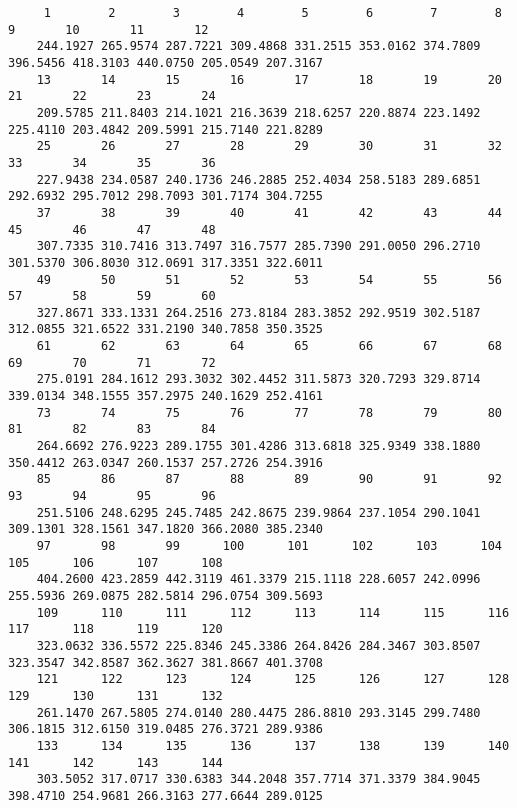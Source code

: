 \documentclass[12pt,letterpaper]{article}
\begin{document}
\begin{enumerate}
	\begin{verbatim}
	 1        2        3        4        5        6        7        8        9       10       11       12 
	244.1927 265.9574 287.7221 309.4868 331.2515 353.0162 374.7809 396.5456 418.3103 440.0750 205.0549 207.3167 
	13       14       15       16       17       18       19       20       21       22       23       24 
	209.5785 211.8403 214.1021 216.3639 218.6257 220.8874 223.1492 225.4110 203.4842 209.5991 215.7140 221.8289 
	25       26       27       28       29       30       31       32       33       34       35       36 
	227.9438 234.0587 240.1736 246.2885 252.4034 258.5183 289.6851 292.6932 295.7012 298.7093 301.7174 304.7255 
	37       38       39       40       41       42       43       44       45       46       47       48 
	307.7335 310.7416 313.7497 316.7577 285.7390 291.0050 296.2710 301.5370 306.8030 312.0691 317.3351 322.6011 
	49       50       51       52       53       54       55       56       57       58       59       60 
	327.8671 333.1331 264.2516 273.8184 283.3852 292.9519 302.5187 312.0855 321.6522 331.2190 340.7858 350.3525 
	61       62       63       64       65       66       67       68       69       70       71       72 
	275.0191 284.1612 293.3032 302.4452 311.5873 320.7293 329.8714 339.0134 348.1555 357.2975 240.1629 252.4161 
	73       74       75       76       77       78       79       80       81       82       83       84 
	264.6692 276.9223 289.1755 301.4286 313.6818 325.9349 338.1880 350.4412 263.0347 260.1537 257.2726 254.3916 
	85       86       87       88       89       90       91       92       93       94       95       96 
	251.5106 248.6295 245.7485 242.8675 239.9864 237.1054 290.1041 309.1301 328.1561 347.1820 366.2080 385.2340 
	97       98       99      100      101      102      103      104      105      106      107      108 
	404.2600 423.2859 442.3119 461.3379 215.1118 228.6057 242.0996 255.5936 269.0875 282.5814 296.0754 309.5693 
	109      110      111      112      113      114      115      116      117      118      119      120 
	323.0632 336.5572 225.8346 245.3386 264.8426 284.3467 303.8507 323.3547 342.8587 362.3627 381.8667 401.3708 
	121      122      123      124      125      126      127      128      129      130      131      132 
	261.1470 267.5805 274.0140 280.4475 286.8810 293.3145 299.7480 306.1815 312.6150 319.0485 276.3721 289.9386 
	133      134      135      136      137      138      139      140      141      142      143      144 
	303.5052 317.0717 330.6383 344.2048 357.7714 371.3379 384.9045 398.4710 254.9681 266.3163 277.6644 289.0125 

\end{verbatim}
\end{enumerate}
\end{document}
